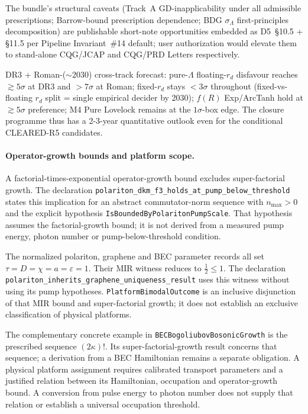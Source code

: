 \documentclass[aps,prd,reprint,nofootinbib,superscriptaddress]{revtex4-2}
\begin{document}
The bundle's structural caveats (Track~A GD-inapplicability under all
admissible prescriptions; Barrow-bound prescription dependence; BDG
$\sigma_\Lambda$ first-principles decomposition) are publishable
short-note opportunities embedded as D5~§10.5 + §11.5 per Pipeline
Invariant~\#14 default; user authorization would elevate them to
stand-alone CQG/JCAP and CQG/PRD Letters respectively.

DR3 + Roman-(${\sim}2030$) cross-track forecast:
pure-$\Lambda$ floating-$r_d$ disfavour reaches $\gtrsim 5\sigma$ at DR3
and ${>}7\sigma$ at Roman; fixed-$r_d$ stays $<3\sigma$ throughout
(fixed-vs-floating $r_d$ split = single empirical decider by 2030);
$f(R)$ Exp/ArcTanh hold at $\gtrsim 5\sigma$ preference; M4 Pure Lovelock
remains at the $1\sigma$-box edge. The closure programme thus has a
2-3-year quantitative outlook even for the conditional CLEARED-R5
candidates.

\paragraph{Operator-growth bounds and platform scope.}
A factorial-times-exponential operator-growth bound excludes
super-factorial growth. The declaration
\texttt{polariton\_dkm\_f3\_holds\_at\_pump\_below\_threshold}
states this implication for an abstract commutator-norm sequence
with $n_{\max}>0$ and the explicit hypothesis
\texttt{IsBoundedByPolaritonPumpScale}. That hypothesis assumes
the factorial-growth bound; it is not derived from a measured
pump energy, photon number or pump-below-threshold condition.

The normalized polariton, graphene and BEC parameter records all
set $\tau=D=\chi=a=\varepsilon=1$. Their MIR witness reduces to
$\tfrac12\le1$. The declaration
\texttt{polariton\_inherits\_graphene\_uniqueness\_result}
uses this witness without using its pump hypotheses.
\texttt{PlatformBimodalOutcome} is an inclusive disjunction of that
MIR bound and super-factorial growth; it does not establish an
exclusive classification of physical platforms.

The complementary concrete example in
\texttt{BECBogoliubovBosonicGrowth} is the prescribed sequence
$(2\kappa)!$. Its super-factorial-growth result concerns that
sequence; a derivation from a BEC Hamiltonian remains a separate
obligation. A physical platform assignment requires calibrated
transport parameters and a justified relation between its
Hamiltonian, occupation and operator-growth bound. A conversion
from pulse energy to photon number does not supply that relation
or establish a universal occupation threshold.
\end{document}
